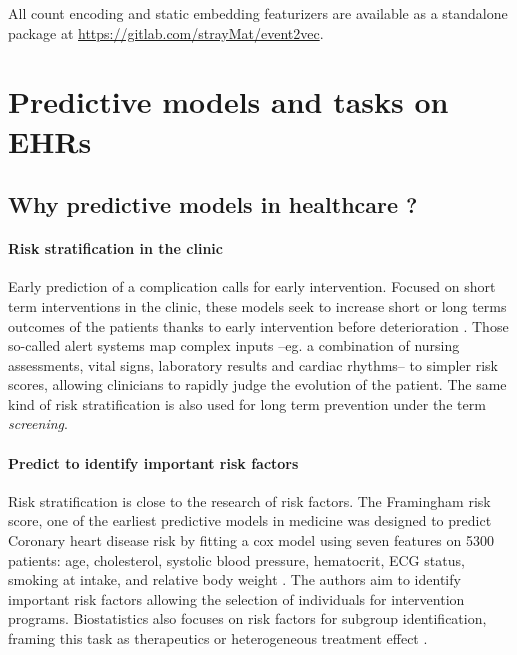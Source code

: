 \documentclass[french,12pt,twoside,a4paper]{book}
\begin{document}
\begin{appendices}
  All count encoding and static embedding featurizers are available as a standalone
  package at \url{https://gitlab.com/strayMat/event2vec}.


  \section{Predictive models and tasks on EHRs}\label{apd:review_predictions}

  \subsection{Why predictive models in healthcare ?}\label{apd:review_tasks}%


  \paragraph{Risk stratification in the clinic}

  Early prediction of a complication calls for early intervention. Focused on short
  term interventions in the clinic, these models seek to increase short or long
  terms outcomes of the patients thanks to early intervention before deterioration
  \citep{tang2007global, rothman2013development, wong2021external}. Those so-called alert systems
  \citep{yu2018artificial} map complex inputs --eg. a combination of nursing
  assessments, vital signs, laboratory results and cardiac rhythms-- to simpler
  risk scores, allowing clinicians to rapidly judge the evolution of the patient.
  The same kind of risk stratification is also used for long term prevention under
  the term \emph{screening}.

  \paragraph{Predict to identify important risk factors}

  Risk stratification is close to the research of risk factors.
  The Framingham risk score, one of the earliest predictive models in medicine was
  designed to predict Coronary heart disease risk by fitting a cox model using
  seven features on 5300 patients: age, cholesterol, systolic blood pressure,
  hematocrit, ECG status, smoking at intake, and relative body weight
  \citep{brand1976multivariate}. The authors aim to identify important risk factors
  allowing the selection of individuals for intervention programs.
  Biostatistics also focuses on risk factors for subgroup identification, framing
  this task as therapeutics \citep{steyerberg2009applications} or heterogeneous
  treatment effect \citep{harrell2001regression}.


\end{appendices}
\end{document}
